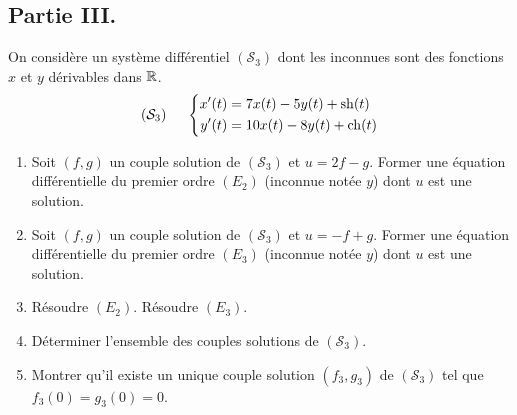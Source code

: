 \subsection*{Partie III.}
On considère un système différentiel $(\mathcal S_3)$ dont les inconnues sont des fonctions $x$ et $y$ dérivables dans $\mathbb{R}$.
\begin{displaymath}
 (\mathcal S_3)\hspace{0.5cm} 
\left\lbrace 
\begin{aligned}
 x'(t) &= 7x(t)-5y(t)+\operatorname{sh}(t)\\
 y'(t) &= 10x(t)-8y(t)+\operatorname{ch}(t)
\end{aligned}
\right. 
\end{displaymath}
\begin{enumerate}
 \item Soit $(f,g)$ un couple solution de $(\mathcal S_3)$ et $u=2f-g$. Former une équation différentielle du premier ordre $(E_2)$ (inconnue notée $y$) dont $u$ est une solution.
 \item Soit $(f,g)$ un couple solution de $(\mathcal S_3)$ et $u=-f+g$. Former une équation différentielle du premier ordre $(E_3)$ (inconnue notée $y$) dont $u$ est une solution.
 \item Résoudre $(E_2)$. Résoudre $(E_3)$.
 \item Déterminer l'ensemble des couples solutions de $(\mathcal S_3)$.
 \item Montrer qu'il existe un unique couple solution $(f_3, g_3)$ de $(\mathcal S_3)$ tel que $f_3(0)=g_3(0)=0$. 
\end{enumerate}
